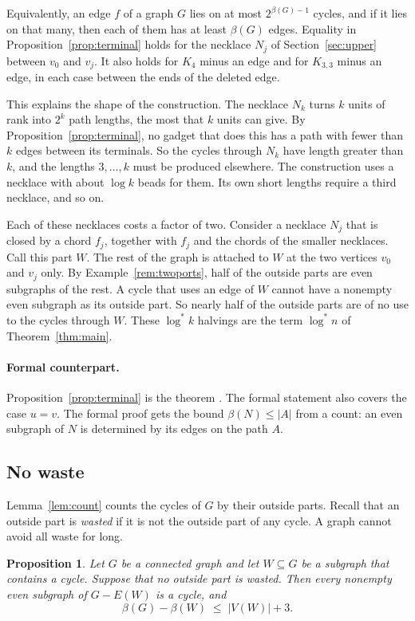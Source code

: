 \documentclass[11pt]{article}
\newtheorem{proposition}[theorem]{Proposition}
\theoremstyle{definition}
\theoremstyle{remark}
\newcommand{\lgs}{\log^{*}}
\numberwithin{equation}{section}
\begin{document}
Equivalently, an edge $f$ of a graph $G$ lies on at most $2^{\beta(G)-1}$ cycles, and if it lies on
that many, then each of them has at least $\beta(G)$ edges. Equality in
Proposition~\ref{prop:terminal} holds for the necklace $N_j$ of Section~\ref{sec:upper} between
$v_0$ and $v_j$. It also holds for $K_4$ minus an edge and for $K_{3,3}$ minus an edge, in each case
between the ends of the deleted edge.

This explains the shape of the construction. The necklace $N_k$ turns $k$ units of rank into
$2^{k}$ path lengths, the most that $k$ units can give. By Proposition~\ref{prop:terminal}, no
gadget that does this has a path with fewer than $k$ edges between its terminals. So the cycles
through $N_k$ have length greater than $k$, and the lengths $3,\dots,k$ must be produced elsewhere.
The construction uses a necklace with about $\log k$ beads for them. Its own short lengths require
a third necklace, and so on.

Each of these necklaces costs a factor of two. Consider a necklace $N_j$ that is closed by a chord
$f_j$, together with $f_j$ and the chords of the smaller necklaces. Call this part $W$. The rest of
the graph is attached to $W$ at the two vertices $v_0$ and $v_j$ only. By
Example~\ref{rem:twoports}, half of the outside parts are even subgraphs of the rest. A cycle that
uses an edge of $W$ cannot have a nonempty even subgraph as its outside part. So nearly half of the
outside parts are of no use to the cycles through $W$. These $\lgs k$ halvings are the term
$\lgs n$ of Theorem~\ref{thm:main}.

\paragraph{Formal counterpart.}
Proposition~\ref{prop:terminal} is the theorem . The formal statement also
covers the case $u=v$. The formal proof gets the bound $\beta(N)\le|A|$ from a count: an even
subgraph of $N$ is determined by its edges on the path $A$.

\subsection{No waste}

Lemma~\ref{lem:count} counts the cycles of $G$ by their outside parts. Recall that an outside
part is \emph{wasted} if it is not the outside part of any cycle. A graph cannot avoid all waste
for long.

\begin{proposition}\label{prop:nowaste}
Let $G$ be a connected graph and let $W\subseteq G$ be a subgraph that contains a cycle. Suppose
that no outside part is wasted. Then every nonempty even subgraph of $G-E(W)$ is a cycle, and
\[
  \beta(G)-\beta(W)\;\le\;|V(W)|+3 .
\]
\end{proposition}
\end{document}

